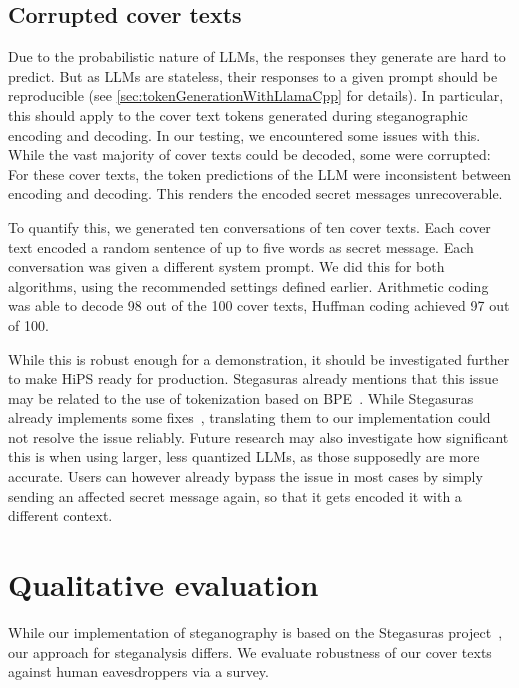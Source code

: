 \subsection{Corrupted cover texts}
\label{sec:corruptedCoverTexts}
Due to the probabilistic nature of \glspl{LLM}, the responses they generate are hard to predict. But as \glspl{LLM} are stateless, their responses to a given prompt should be reproducible (see \cref{sec:tokenGenerationWithLlamaCpp} for details). In particular, this should apply to the cover text tokens generated during steganographic encoding and decoding. In our testing, we encountered some issues with this. While the vast majority of cover texts could be decoded, some were corrupted: For these cover texts, the token predictions of the \gls{LLM} were inconsistent between encoding and decoding. This renders the encoded secret messages unrecoverable.

To quantify this, we generated ten conversations of ten cover texts. Each cover text encoded a random sentence of up to five words as secret message. Each conversation was given a different system prompt. We did this for both algorithms, using the recommended settings defined earlier. Arithmetic coding was able to decode 98 out of the 100 cover texts, Huffman coding achieved 97 out of 100.

While this is robust enough for a demonstration, it should be investigated further to make \gls{HiPS} ready for production. Stegasuras already mentions that this issue may be related to the use of tokenization based on \gls{BPE}~\cite{zieglerStegasuras2025}. While Stegasuras already implements some fixes~\cite{zieglerHarvardnlpNeuralSteganography2025}, translating them to our implementation could not resolve the issue reliably. Future research may also investigate how significant this is when using larger, less quantized \glspl{LLM}, as those supposedly are more accurate. Users can however already bypass the issue in most cases by simply sending an affected secret message again, so that it gets encoded it with a different context.

\section{Qualitative evaluation}
\label{sec:qualitativeEvaluation}
While our implementation of steganography is based on the Stegasuras project~\cite{zieglerNeuralLinguisticSteganography2019}, our approach for steganalysis differs. We evaluate robustness of our cover texts against human eavesdroppers via a survey.

